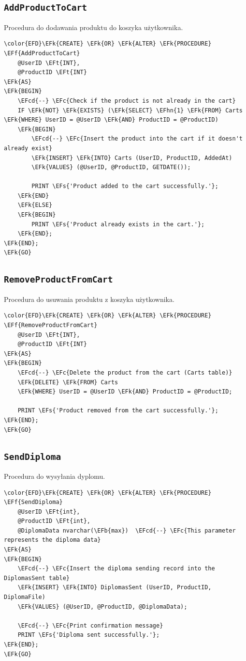\documentclass[11pt]{article}
\newcommand{\EFc}[1]{\textcolor{EFc}{\textit{#1}}} %
\newcommand{\EFcd}[1]{\textcolor{EFcd}{\textit{#1}}} %
\newcommand{\EFs}[1]{\textcolor{EFs}{#1}} %
\newcommand{\EFk}[1]{\textcolor{EFk}{\textbf{#1}}} %
\newcommand{\EFb}[1]{\textcolor{EFb}{\textbf{#1}}} %
\newcommand{\EFf}[1]{\textcolor{EFf}{#1}} %
\newcommand{\EFt}[1]{\textcolor{EFt}{\textbf{#1}}} %
\newcommand{\EFhn}[1]{\textcolor{EFhn}{#1}} %
\begin{document}
\subsection{\texttt{AddProductToCart}}
\label{sec:org017f08d}
Procedura do dodawania produktu do koszyka użytkownika.
\begin{Code}
\begin{Verbatim}
\color{EFD}\EFk{CREATE} \EFk{OR} \EFk{ALTER} \EFk{PROCEDURE} \EFf{AddProductToCart}
    @UserID \EFt{INT},
    @ProductID \EFt{INT}
\EFk{AS}
\EFk{BEGIN}
    \EFcd{--} \EFc{Check if the product is not already in the cart}
    IF \EFk{NOT} \EFk{EXISTS} (\EFk{SELECT} \EFhn{1} \EFk{FROM} Carts \EFk{WHERE} UserID = @UserID \EFk{AND} ProductID = @ProductID)
    \EFk{BEGIN}
        \EFcd{--} \EFc{Insert the product into the cart if it doesn't already exist}
        \EFk{INSERT} \EFk{INTO} Carts (UserID, ProductID, AddedAt)
        \EFk{VALUES} (@UserID, @ProductID, GETDATE());

        PRINT \EFs{'Product added to the cart successfully.'};
    \EFk{END}
    \EFk{ELSE}
    \EFk{BEGIN}
        PRINT \EFs{'Product already exists in the cart.'};
    \EFk{END};
\EFk{END};
\EFk{GO}
\end{Verbatim}
\end{Code}
\subsection{\texttt{RemoveProductFromCart}}
\label{sec:orgc8827e4}
Procedura do usuwania produktu z koszyka użytkownika.
\begin{Code}
\begin{Verbatim}
\color{EFD}\EFk{CREATE} \EFk{OR} \EFk{ALTER} \EFk{PROCEDURE} \EFf{RemoveProductFromCart}
    @UserID \EFt{INT},
    @ProductID \EFt{INT}
\EFk{AS}
\EFk{BEGIN}
    \EFcd{--} \EFc{Delete the product from the cart (Carts table)}
    \EFk{DELETE} \EFk{FROM} Carts
    \EFk{WHERE} UserID = @UserID \EFk{AND} ProductID = @ProductID;

    PRINT \EFs{'Product removed from the cart successfully.'};
\EFk{END};
\EFk{GO}
\end{Verbatim}
\end{Code}
\subsection{\texttt{SendDiploma}}
\label{sec:orgeaf4704}
Procedura do wysyłania dyplomu.
\begin{Code}
\begin{Verbatim}
\color{EFD}\EFk{CREATE} \EFk{OR} \EFk{ALTER} \EFk{PROCEDURE} \EFf{SendDiploma}
    @UserID \EFt{int},
    @ProductID \EFt{int},
    @DiplomaData nvarchar(\EFb{max})  \EFcd{--} \EFc{This parameter represents the diploma data}
\EFk{AS}
\EFk{BEGIN}
    \EFcd{--} \EFc{Insert the diploma sending record into the DiplomasSent table}
    \EFk{INSERT} \EFk{INTO} DiplomasSent (UserID, ProductID, DiplomaFile)
    \EFk{VALUES} (@UserID, @ProductID, @DiplomaData);

    \EFcd{--} \EFc{Print confirmation message}
    PRINT \EFs{'Diploma sent successfully.'};
\EFk{END};
\EFk{GO}
\end{Verbatim}
\end{Code}
\end{document}
